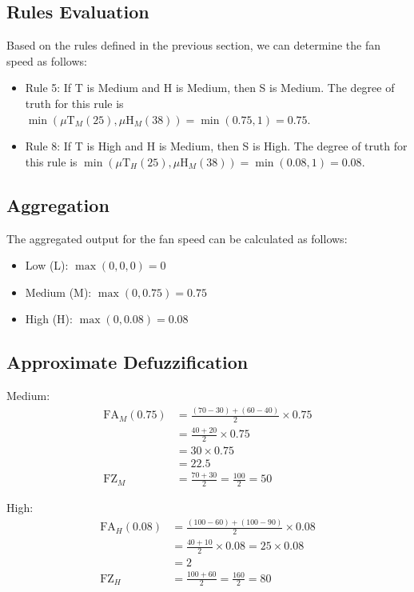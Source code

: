 \documentclass[12pt,a4paper]{article}
\begin{document}
\subsection{Rules Evaluation}
Based on the rules defined in the previous section, we can determine the fan speed as follows:
\begin{itemize}
    \item Rule 5: If T is Medium and H is Medium, then S is Medium. The degree of truth for this rule is $\min(\mu\text{T}_M(25), \mu\text{H}_M(38)) = \min(0.75, 1) = 0.75$.
    \item Rule 8: If T is High and H is Medium, then S is High. The degree of truth for this rule is $\min(\mu\text{T}_H(25), \mu\text{H}_M(38)) = \min(0.08, 1) = 0.08$.
\end{itemize}

\subsection{Aggregation}
The aggregated output for the fan speed can be calculated as follows:
\begin{itemize}
    \item Low (L): $\max(0, 0, 0) = 0$
    \item Medium (M): $\max(0, 0.75) = 0.75$
    \item High (H): $\max(0, 0.08) = 0.08$
\end{itemize}

\subsection{Approximate Defuzzification}

Medium:
\begin{align}
    \text{FA}_M(0.75) &= \frac{(70 - 30) + (60 - 40)}{2} \times 0.75 \\
    &= \frac{40 + 20}{2} \times 0.75 \\
    &= 30 \times 0.75 \\
    &= 22.5 \\
    \text{FZ}_M &= \frac{70 + 30}{2} = \frac{100}{2} = 50
\end{align}

High:
\begin{align}
    \text{FA}_H(0.08) &= \frac{(100 - 60) + (100 - 90)}{2} \times 0.08 \\
    &= \frac{40 + 10}{2} \times 0.08 = 25 \times 0.08 \\
    &= 2 \\
    \text{FZ}_H &= \frac{100 + 60}{2} = \frac{160}{2} = 80
\end{align}
\end{document}
